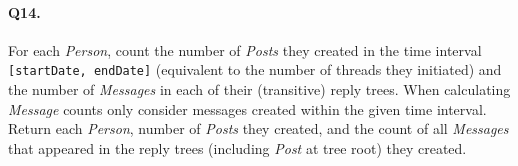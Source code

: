 \paragraph{Q14.}
For each \emph{Person}, count the number of \emph{Posts} they created in
the time interval \texttt{{[}startDate,\ endDate{]}} (equivalent to the
number of threads they initiated) and the number of \emph{Messages} in
each of their (transitive) reply trees. When calculating \emph{Message}
counts only consider messages created within the given time interval.
Return each \emph{Person}, number of \emph{Posts} they created, and the
count of all \emph{Messages} that appeared in the reply trees (including
\emph{Post} at tree root) they created.
